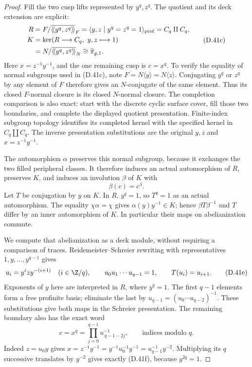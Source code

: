 \begin{proof}
Fill the two cusp lifts represented by $y^q,z^q$.
The quotient and its deck extension are explicit:
\[
\begin{split}
 R&=F/\overline{\langle\!\langle y^q,z^q\rangle\!\rangle}_F
       =\langle y,z\mid y^q=z^q=1\rangle_{\rm prof}
       =C_q\amalg C_q,\\
 K&=\ker(R\longrightarrow C_q,\ y,z\longmapsto1)\\
  &=N/\overline{\langle\!\langle y^q,z^q
                                      \rangle\!\rangle}_N
       \cong\widehat\pi_{g,1}.
\end{split}                                             \tag{D.41c}
\]
Here $x=z^{-1}y^{-1}$, and the one remaining cusp is
$c=x^q$.  To verify the equality of normal subgroups
used in (D.41c), note $F=N\langle y\rangle=N\langle z\rangle$.
Conjugating $y^q$ or $z^q$ by any element of $F$ therefore
gives an $N$-conjugate of the same element.  Thus its
closed $F$-normal closure is its closed $N$-normal closure.
The completion comparison is also exact: start with the
discrete cyclic surface cover, fill those two boundaries,
and complete the displayed quotient presentation.
Finite-index subgroup topology identifies its completed
kernel with the specified kernel in $C_q\amalg C_q$.
The inverse presentation substitutions are the original
$y,z$ and $x=z^{-1}y^{-1}$.

The automorphism $\alpha$ preserves this normal subgroup,
because it exchanges the two filled peripheral classes.
It therefore induces an actual automorphism of $R$,
preserves $K$, and induces an involution $\beta$ of $K$
with
\[
                           \beta(c)=c^\lambda.
                                                        \tag{D.41d}
\]
Let $T$ be conjugation by $y$ on $K$.  In $R$, $y^q=1$,
so $T^q=1$ as an actual automorphism.  The equality
$\chi\alpha=\chi$ gives $\alpha(y)y^{-1}\in K$; hence
$\beta T\beta^{-1}$ and $T$ differ by an inner
automorphism of $K$.  In particular their maps on
abelianization commute.

We compute that abelianization as a deck module, without
requiring a comparison of traces.  Reidemeister--Schreier
rewriting with representatives $1,y,\ldots,y^{q-1}$ gives
\[
 u_i=y^i z y^{-(i+1)}\quad(i\in\Z/q),\qquad
 u_0u_1\cdots u_{q-1}=1,\qquad T(u_i)=u_{i+1}.
                                                        \tag{D.41e}
\]
Exponents of $y$ here are interpreted in $R$, where
$y^q=1$.  The first $q-1$ elements form a free profinite
basis; eliminate the last by
$u_{q-1}=(u_0\cdots u_{q-2})^{-1}$.
These substitutions give both maps in the Schreier
presentation.  The remaining boundary also has the exact
word
\[
 c=x^q=\prod_{j=0}^{q-1}u_{\,q-1-2j}^{-1},
                       \qquad\text{indices modulo }q.
                                                        \tag{D.41f}
\]
Indeed $z=u_0y$ gives
$x=z^{-1}y^{-1}=y^{-1}u_0^{-1}y^{-1}
 =u_{q-1}^{-1}y^{-2}$.
Multiplying its $q$ successive translates by $y^{-2}$
gives exactly (D.41f), because $y^{2q}=1$.


\end{proof}
